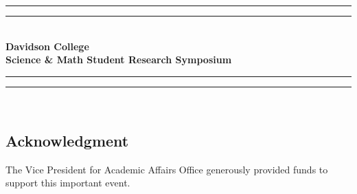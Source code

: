
% 


\begin{customtitle}
	\begin{center} %
		\vspace*{5\baselineskip} %

		\rule{\textwidth}{1.6pt}\vspace*{-\baselineskip}\vspace*{2pt} %
		\rule{\textwidth}{0.4pt}\\[\baselineskip] %

		{\LARGE\bfseries Davidson College\\
		[0.4\baselineskip]
		Science \& Math Student Research Symposium}\\
		[0.2\baselineskip]

		\rule{\textwidth}{0.4pt}\vspace*{-\baselineskip}\vspace{3.2pt} %
		\rule{\textwidth}{1.6pt}\\[\baselineskip] %


		\vspace{2\baselineskip}
		{\LARGE \customdate}

		\vspace*{2\baselineskip} %

		\renewcommand{\contentsname}{\scshape Contents}
		{\flushleft\Large \tableofcontents}

		\vfill

		\subsection*{Acknowledgment}
		\begin{flushleft}
			\textnormal{The Vice President for Academic Affairs Office
			generously provided funds to support this important event.}
		\end{flushleft}

	\end{center}
\end{customtitle}
